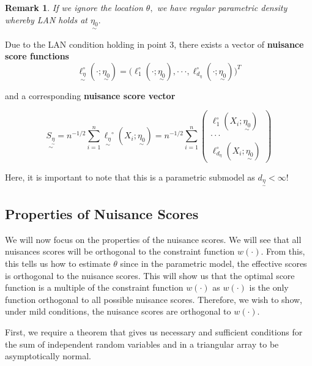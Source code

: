 \documentclass[twoside]{article}
\newtheorem{remark}[theorem]{Remark}
\newcommand{\utilde}{\underset{\sim}}
\begin{document}
\begin{remark}  If we ignore the location $\theta,$ we have regular parametric density whereby LAN holds at $\utilde{\eta_{0}}.$ 
\end{remark}

Due to the LAN condition holding in point 3, there exists a vector of \textbf{nuisance score functions}
\begin{equation}
    \utilde{\ell_{\eta}^{\circ}}(\cdot ; \utilde{\eta_{0}}) = \big(\ell_{1}^{\circ}(\cdot; \utilde{\eta_{0}}), \cdot \cdot \cdot, \ell_{d_{\eta}}^{\circ}(\cdot; \utilde{\eta_{0}}) \big)^T
\end{equation}

and a corresponding \textbf{nuisance score vector}

\begin{equation}
    \utilde{S_{\utilde{\eta}}} = n^{-1/2}\sum_{i=1}^{n}\utilde{\ell_{\eta}}^{\circ}(X_i; \utilde{\eta_{0}}) = n^{-1/2}\sum_{i=1}^{n}\begin{pmatrix} \ell_{1}^{\circ}(X_i; \utilde{\eta_0}) \\ \cdot \cdot \cdot \\ \ell_{d_{\eta}}^{\circ}(X_i; \utilde{\eta_0}) \end{pmatrix}
\end{equation}

Here, it is important to note that this is a parametric submodel as $d_{\utilde{\eta}} < \infty$!

\subsection{Properties of Nuisance Scores}

We will now focus on the properties of the nuisance scores. We will see that all nuisances scores will be orthogonal to the constraint function $w(\cdot).$ From this, this tells us how to estimate $\theta$ since in the parametric model, the effective scores is orthogonal to the nuisance scores. This will show us that the optimal score function is a multiple of the constraint function $w(\cdot)$ as $w(\cdot)$ is the only function orthogonal to all possible nuisance scores. Therefore, we wish to show, under mild conditions, the nuisance scores are orthogonal to $w(\cdot).$ 

First, we require a theorem that gives us necessary and sufficient conditions for the sum of independent random variables and in a triangular array to be asymptotically normal.
\end{document}
